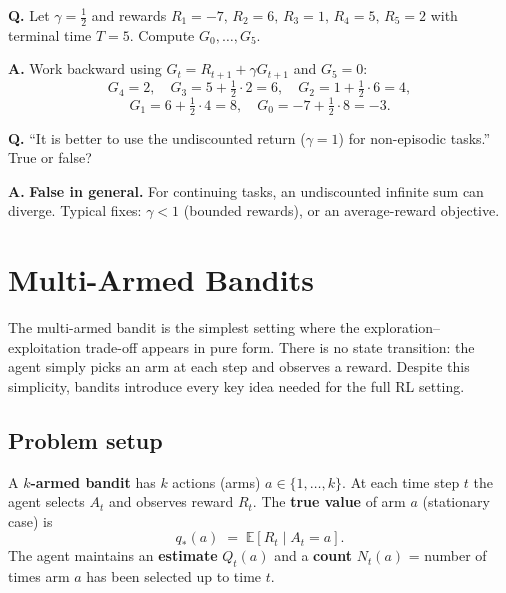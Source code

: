 \documentclass[11pt, oneside]{book}
\newcommand{\E}{\mathbb{E}}
\newcommand{\qtrue}{q_{*}}            %
\begin{document}
\begin{exbox}[title={Exam: Return Computation}]
\textbf{Q.} Let $\gamma = \tfrac{1}{2}$ and rewards $R_1=-7,\,R_2=6,\,R_3=1,\,R_4=5,\,R_5=2$
with terminal time $T=5$. Compute $G_0,\dots,G_5$.

\medskip
\textbf{A.} Work backward using $G_t = R_{t+1} + \gamma G_{t+1}$ and $G_5=0$:
\[
  G_4=2,\quad G_3=5+\tfrac12\cdot2=6,\quad G_2=1+\tfrac12\cdot6=4,
\]
\[
  G_1=6+\tfrac12\cdot4=8,\quad G_0=-7+\tfrac12\cdot8=-3.
\]
\end{exbox}

\begin{exbox}[title={Exam: Undiscounted Return for Non-Episodic Tasks}]
\textbf{Q.} ``It is better to use the undiscounted return ($\gamma=1$) for
non-episodic tasks.'' True or false?

\medskip
\textbf{A.} \textbf{False in general.} For continuing tasks, an undiscounted
infinite sum can diverge. Typical fixes: $\gamma < 1$ (bounded rewards), or
an average-reward objective.
\end{exbox}


\chapter{Multi-Armed Bandits}

The multi-armed bandit is the simplest setting where the
exploration--exploitation trade-off appears in pure form. There is no state
transition: the agent simply picks an arm at each step and observes a reward.
Despite this simplicity, bandits introduce every key idea needed for the
full RL setting.

\section{Problem setup}

\begin{defbox}[title={$k$-Armed Bandit}]
A \textbf{$k$-armed bandit} has $k$ actions (arms) $a \in \{1,\dots,k\}$.
At each time step $t$ the agent selects $A_t$ and observes reward $R_t$.
The \textbf{true value} of arm $a$ (stationary case) is
\[
  \qtrue(a) \;=\; \E[R_t \mid A_t = a].
\]
The agent maintains an \textbf{estimate} $Q_t(a)$ and a \textbf{count}
$N_t(a)$ = number of times arm $a$ has been selected up to time $t$.
\end{defbox}
\end{document}
